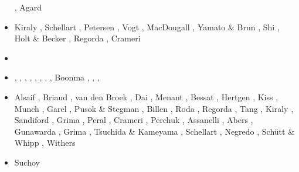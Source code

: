 \begin{scriptsize}
\begin{itemize}
                           \cite{jada16b}\cite{liku16}
                           \cite{chss16}, Agard \etal \cite{agys16}
\item[\twothousandseventeen] Kiraly \etal \cite{kicf17}, Schellart \cite{sche17}, 
                             Petersen \etal \cite{pest17}, Vogt \etal \cite{vomc17}, 
                             MacDougall \etal \cite{majf17}, Yamato \& Brun \cite{yabr17}, 
                             Shi \etal \cite{shwl17}, Holt \& Becker \cite{hobe17}, 
                             Regorda \etal \cite{rerm17}, Crameri \etal \cite{crlt17}
\item[\twothousandeighteen] \cite{yamz18}\cite{crli18}
                            \cite{spcv18}\cite{chss18}
                            \cite{yagz18}\cite{mazh18}
                            \cite{pukp18}\cite{masg18}
                            \cite{biar18}
\item[\twothousandnineteen] \cite{magn19}, \cite{mavb19},
                            \cite{scvm19}, \cite{cakc19},
                            \cite{samo19}, \cite{sihf19},
                            \cite{meag19}, \cite{vaws19}, 
                            Boonma \etal \cite{bokg19}, \cite{vawg19},
                            \cite{cibi19}, \cite{pust19}
\item[\twothousandtwenty] Alsaif \etal \cite{algg20}, Briaud \etal \cite{braf20},
                          van den Broek \etal \cite{vamg20}, Dai \etal \cite{dawl20},
                          Menant \etal \cite{meag20}, Bessat \etal \cite{bedh20},
                          Hertgen \etal \cite{heyg20}, Kiss \etal \cite{kicd20},
                          Munch \etal \cite{mugu20}, Garel \etal \cite{gatt20},
                          Pusok \& Stegman \cite{pust20}, Billen \cite{bill20},
                          Roda \etal \cite{rozr20}, Regorda \etal \cite{relr20}, 
                          Tang \etal \cite{tacm20}, Kiraly \etal \cite{kiph20}, 
                          Sandiford \etal \cite{sams20}, Grima \etal \cite{grlc20}, 
                          Peral \etal \cite{perz20}, Crameri \etal \cite{crmd20}, 
                          Perchuk \etal \cite{pegz20}, Assanelli \etal \cite{aslr20}, 
                          Abers \etal \cite{abvw20}, Gunawarda \etal \cite{gumc20},
                          Grima \etal \cite{grlc20}, Tsuchida \& Kameyama \cite{tska20},
                          Schellart \cite{sche20}, Negredo \etal \cite{nemc20},
                          Sch{\"u}tt \& Whipp \cite{scwh20}, Withers \cite{with20}
\item[\twothousandtwentyone] Suchoy \etal \cite{sugm21}
\end{itemize}
\end{scriptsize}


